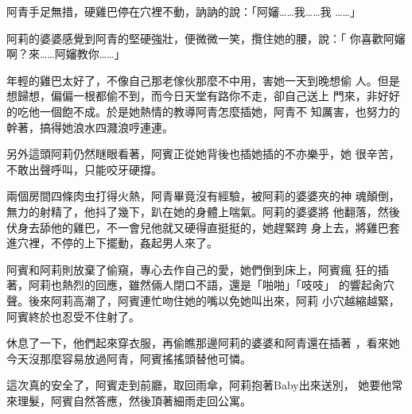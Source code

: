 阿青手足無措，硬雞巴停在穴裡不動，訥訥的說：「阿嬸……我……我
……」

阿莉的婆婆感覺到阿青的堅硬強壯，便微微一笑，攬住她的腰，說：「
你喜歡阿嬸啊？來……阿嬸教你……」

年輕的雞巴太好了，不像自己那老傢伙那麼不中用，害她一天到晚想偷
人。但是想歸想，偏偏一根都偷不到，而今日天堂有路你不走，卻自己送上
門來，非好好的吃他一個飽不成。於是她熱情的教導阿青怎麼插她，阿青不
知厲害，也努力的幹著，搞得她浪水四濺浪哼連連。

另外這頭阿莉仍然瞇眼看著，阿賓正從她背後也插她插的不亦樂乎，她
很辛苦，不敢出聲呼叫，只能咬牙硬撐。

兩個房間四條肉虫打得火熱，阿青畢竟沒有經驗，被阿莉的婆婆夾的神
魂顛倒，無力的射精了，他抖了幾下，趴在她的身體上喘氣。阿莉的婆婆將
他翻落，然後伏身去舔他的雞巴，不一會兒他就又硬得直挺挺的，她趕緊跨
身上去，將雞巴套進穴裡，不停的上下擺動，姦起男人來了。

阿賓和阿莉則放棄了偷窺，專心去作自己的愛，她們倒到床上，阿賓瘋
狂的插著，阿莉也熱烈的回應，雖然倆人閉口不語，還是「啪啪」「吱吱」
的響起肏穴聲。後來阿莉高潮了，阿賓連忙吻住她的嘴以免她叫出來，阿莉
小穴越縮越緊，阿賓終於也忍受不住射了。

休息了一下，他們起來穿衣服，再偷瞧那邊阿莉的婆婆和阿青還在插著
，看來她今天沒那麼容易放過阿青，阿賓搖搖頭替他可憐。

這次真的安全了，阿賓走到前廳，取回雨傘，阿莉抱著Baby出來送別，
她要他常來理髮，阿賓自然答應，然後頂著細雨走回公寓。










